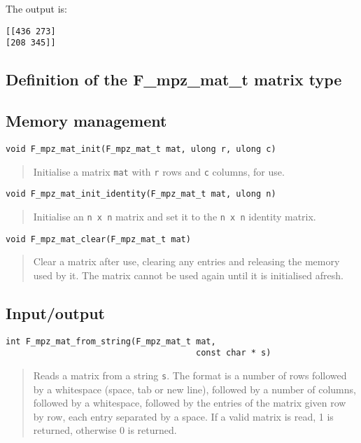 \documentclass[a4paper,10pt]{article}
\newcommand{\code}{\lstinline}
\begin{document}
The output is:

\begin{lstlisting}
[[436 273]
[208 345]]
\end{lstlisting}

\subsection{Definition of the F\_mpz\_mat\_t matrix type}

\subsection{Memory management}

\begin{lstlisting}
void F_mpz_mat_init(F_mpz_mat_t mat, ulong r, ulong c)
\end{lstlisting}
\begin{quote}
Initialise a matrix \code{mat} with \code{r} rows and \code{c} columns, for use.
\end{quote}

\begin{lstlisting}
void F_mpz_mat_init_identity(F_mpz_mat_t mat, ulong n)
\end{lstlisting}
\begin{quote}
Initialise an \code{n x n} matrix and set it to the \code{n x n} identity matrix.
\end{quote}

\begin{lstlisting}
void F_mpz_mat_clear(F_mpz_mat_t mat)
\end{lstlisting}
\begin{quote}
Clear a matrix after use, clearing any entries and releasing the memory used by it. The matrix cannot
be used again until it is initialised afresh.
\end{quote}

\subsection{Input/output}

\begin{lstlisting}
int F_mpz_mat_from_string(F_mpz_mat_t mat, 
                                      const char * s)
\end{lstlisting}
\begin{quote}
Reads a matrix from a string \code{s}. The format is a number of rows followed by a whitespace (space, tab or
new line), followed by a number of columns, followed by a whitespace, followed by the entries of the matrix
given row by row, each entry separated by a space. If a valid matrix is read, 1 is returned, otherwise 0 is
returned.
\end{quote}
\end{document}
